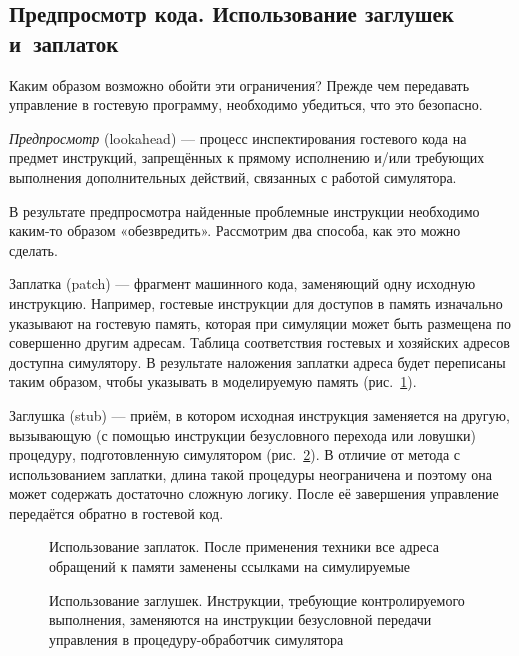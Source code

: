 \subsection[Предпросмотр кода]{Предпросмотр кода. Использование заглушек и~заплаток}

Каким образом возможно обойти эти ограничения? Прежде чем передавать управление в гостевую программу, необходимо убедиться, что это безопасно. 

\textit{Предпросмотр} (\abbr lookahead) — процесс инспектирования гостевого кода на предмет инструкций, запрещённых к прямому исполнению и/или требующих выполнения дополнительных действий, связанных с работой симулятора.

В результате предпросмотра найденные проблемные инструкции необходимо каким-то образом «обезвредить». Рассмотрим два способа, как это можно сделать.

\begin{description*}
\item[Заплатка (\abbr patch)] — фрагмент машинного кода, заменяющий одну исходную инструкцию. Например, гостевые инструкции для доступов в память изначально указывают на гостевую память, которая при симуляции может быть размещена по совершенно другим адресам. Таблица соответствия гостевых и хозяйских адресов доступна симулятору. В результате наложения заплатки адреса будет переписаны таким образом, чтобы указывать в моделируемую память (рис.~\ref{fig:patching}).

\item[Заглушка (\abbr stub)] — приём, в котором исходная инструкция заменяется на другую, вызывающую (с помощью инструкции безусловного перехода или ловушки) процедуру, подготовленную симулятором (рис.~\ref{fig:stubbing}). В отличие от метода с использованием заплатки, длина такой процедуры неограничена и поэтому она может содержать достаточно сложную логику. После её завершения управление передаётся обратно в гостевой код.
\end{description*}

\begin{figure}[htpb]
    \centering
    \caption[Использование заплаток]{Использование заплаток. После применения техники все адреса обращений к памяти заменены ссылками на симулируемые}
    \label{fig:patching}
\end{figure}

\begin{figure}[htpb]
    \centering
    \caption[Использование заглушек]{Использование заглушек. Инструкции, требующие контролируемого выполнения, заменяются на инструкции безусловной передачи управления в процедуру-обработчик симулятора}
    \label{fig:stubbing}
\end{figure}

